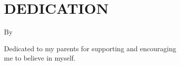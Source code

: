 \chapter*{DEDICATION}

\parbox{\textwidth}{\centering\MakeUppercase{\thetitle}

\vspace{15pt}{\noindent\newline\theThesisType}

\vspace{8pt}By

\vspace{8pt}{\ifdefined\theStudyType\theFirstStudent\fi}
}

\vspace{5ex}
{\parbox{\textwidth}{\large\centering Dedicated to my parents for supporting and encouraging \\me to believe in myself.}}